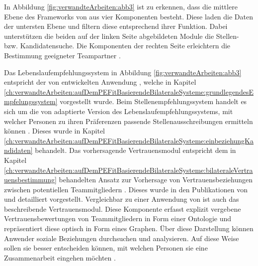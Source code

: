 In Abbildung \ref{fig:verwandteArbeiten:abb3} ist zu erkennen, dass die mittlere Ebene des Frameworks von \textcite[S. 5ff.]{keim:2007} aus vier Komponenten besteht. Diese laden die Daten der untersten Ebene und filtern diese entsprechend ihrer Funktion. Dabei unterstützen die beiden auf der linken Seite abgebildeten Module die Stellen- bzw. Kandidatensuche. Die Komponenten der rechten Seite erleichtern die Bestimmung geeigneter Teampartner \cite[S. 5]{keim:2007}.

Das Lebenslaufempfehlungssystem in Abbildung \ref{fig:verwandteArbeiten:abb3} entspricht der von \textcite[S. 8ff.]{faerber:2003} entwickelten Anwendung \cite[S. 6]{keim:2007}, welche in Kapitel \ref{ch:verwandteArbeiten:aufDemPEFitBasierendeBilateraleSysteme:grundlegendesEmpfelungssystem} vorgestellt wurde. Beim Stellenempfehlungssystem handelt es sich um die von \textcite[S. 4ff.]{malinowski:2006} adaptierte Version des Lebenslaufempfehlungssystems, mit welcher Personen zu ihren Präferenzen passende Stellenausschreibungen ermitteln können \cite[S. 6]{keim:2007}. Dieses wurde in Kapitel \ref{ch:verwandteArbeiten:aufDemPEFitBasierendeBilateraleSysteme:einbeziehungKandidaten} behandelt. Das vorhersagende Vertrauensmodul entspricht dem in Kapitel \ref{ch:verwandteArbeiten:aufDemPEFitBasierendeBilateraleSysteme:bilateraleVertrauensbestimmung} behandelten Ansatz zur Vorhersage von Vertrauensbeziehungen zwischen potentiellen Teammitgliedern \cite[S. 8]{keim:2007}. Dieses wurde in den Publikationen von \textcite[S. 5ff.]{keim:2005} und \textcite[S. 4ff.]{malinowski:2005} detailliert vorgestellt. Vergleichbar zu einer Anwendung von \textcite[S. 4f.]{keim:2005} ist auch das beschreibende Vertrauensmodul. Diese Komponente erfasst explizit vergebene Vertrauensbewertungen von Teammitgliedern in Form einer Ontologie und repräsentiert diese optisch in Form eines Graphen. Über diese Darstellung können Anwender soziale Beziehungen durchsuchen und analysieren. Auf diese Weise sollen sie besser entscheiden können, mit welchen Personen sie eine Zusammenarbeit eingehen möchten \cite[S. 7]{keim:2007}.

